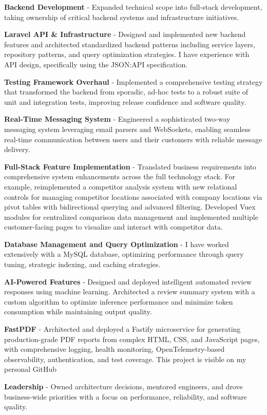 \begin{cventries}
{\begin{cvitems}
            \item {\textbf{Backend Development} - Expanded technical scope into full-stack development, taking ownership of critical backend systems and infrastructure initiatives.}
        \end{cvitems}
        \begin{cvsubitems}
            \item {\textbf{Laravel API \& Infrastructure} - Designed and implemented new backend features and architected standardized backend patterns including service layers, repository patterns, and query optimization strategies. I have experience with API design, specifically using the JSON:API specification.}
            \item {\textbf{Testing Framework Overhaul} - Implemented a comprehensive testing strategy that transformed the backend from sporadic, ad-hoc tests to a robust suite of unit and integration tests, improving release confidence and software quality.}
            \item {\textbf{Real-Time Messaging System} - Engineered a sophisticated two-way messaging system leveraging email parsers and WebSockets, enabling seamless real-time communication between users and their customers with reliable message delivery.}
            \item {\textbf{Full-Stack Feature Implementation} - Translated business requirements into comprehensive system enhancements across the full technology stack. For example, reimplemented a competitor analysis system with new relational controls for managing competitor locations associated with company locations via pivot tables with bidirectional querying and advanced filtering. Developed Vuex modules for centralized comparison data management and implemented multiple customer-facing pages to visualize and interact with competitor data.}
            \item {\textbf{Database Management and Query Optimization} - I have worked extensively with a MySQL database, optimizing performance through query tuning, strategic indexing, and caching strategies.}
            \item {\textbf{AI-Powered Features} - Designed and deployed intelligent automated review responses using machine learning. Architected a review summary system with a custom algorithm to optimize inference performance and minimize token consumption while maintaining output quality.}
            \item {\textbf{FastPDF} - Architected and deployed a Fastify microservice for generating production-grade PDF reports from complex HTML, CSS, and JavaScript pages, with comprehensive logging, health monitoring, OpenTelemetry-based observability, authentication, and test coverage. This project is visible on my personal GitHub}
        \end{cvsubitems}
        \begin{cvitems}
            \item {\textbf{Leadership} - Owned architecture decisions, mentored engineers, and drove business-wide priorities with a focus on performance, reliability, and software quality.}
        \end{cvitems}
    }
\end{cventries}
